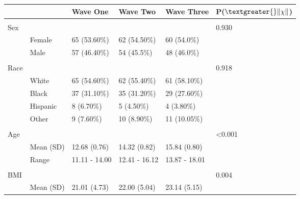 \documentclass{article}
\begin{document}
\begin{table}[h!]
\begin{tabular}{llllll}
                    &                 & Wave One         & Wave Two         & Wave Three       & P($\textgreater{}\|\chi\|$)       \\ \hline \\
Sex                 &                 &                  &                  &                  & 0.930                    \\
                    & Female          & 65 (53.60\%)     & 62 (54.50\%)     & 60 (54.0\%)      &                          \\
                    & Male            & 57 (46.40\%)     & 54 (45.5\%)      & 48 (46.0\%)      &                          \\ \hline \\
Race                &                 &                  &                  &                  & 0.918                    \\
                    & White           & 65 (54.60\%)      & 62 (55.40\%)      & 61 (58.10\%)      &                          \\
                    & Black           & 37 (31.10\%)      & 35 (31.20\%)      & 29 (27.60\%)      &                          \\
                    & Hispanic        & 8 (6.70\%)        & 5 (4.50\%)        & 4 (3.80\%)        &                          \\
                    & Other           & 9 (7.60\%)       & 10 (8.90\%)       & 11 (10.05\%)      &                          \\ \hline \\
Age        &                 &                  &                  &                  & \textless 0.001 \\
                    & Mean (SD)       & 12.68 (0.76)   & 14.32 (0.82)   & 15.84 (0.80)   &                          \\
                    & Range           & 11.11 - 14.00    & 12.41 - 16.12     & 13.87 - 18.01    &                          \\       \hline \\              
BMI        &                 &                  &                  &                  & 0.004           \\
                    & Mean (SD)       & 21.01 (4.73)   & 22.00 (5.04)   & 23.14 (5.15)   &                          \\

\end{tabular}
\end{table}
\end{document}
